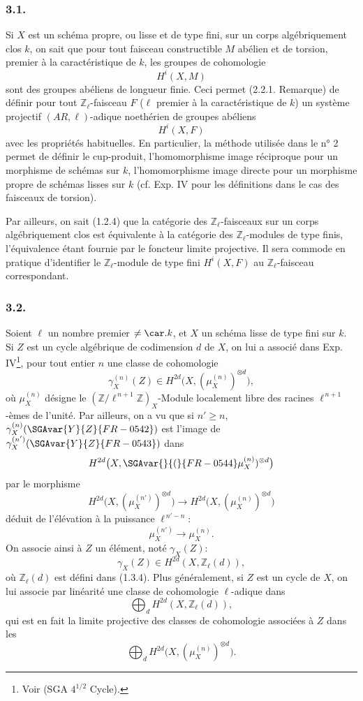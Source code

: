 \subsubsection*{3.1.}
Si \(X\) est un schéma propre, ou lisse et de type fini, sur un corps algébriquement clos \(k\), on sait que pour tout faisceau constructible \(M\) abélien et de torsion, premier à la caractéristique de \(k\), les groupes de cohomologie
\[
H^i(X,M)
\]
sont des groupes abéliens de longueur finie. Ceci permet (2.2.1. Remarque) de définir pour tout \(\mathbb{Z}_\ell\)-faisceau \(F\) (\(\ell\) premier à la caractéristique de \(k\)) un système projectif \((AR,\ell)\)-adique noethérien de groupes abéliens
\[
H^i(X,F)
\]
avec les propriétés habituelles. En particulier, la méthode utilisée dans le n° 2 permet de définir le cup-produit, l'homomorphisme image réciproque pour un morphisme de schémas sur \(k\), l'homomorphisme image directe pour un morphisme propre de schémas lisses sur \(k\) (cf. Exp. IV pour les définitions dans le cas des faisceaux de torsion).

Par ailleurs, on sait (1.2.4) que la catégorie des \(\mathbb{Z}_\ell\)-faisceaux sur un corps algébriquement clos est équivalente à la catégorie des \(\mathbb{Z}_\ell\)-modules de type finis, l'équivalence étant fournie par le foncteur limite projective. Il sera commode en pratique d'identifier le \(\mathbb{Z}_\ell\)-module de type fini \(H^i(X,F)\) au \(\mathbb{Z}_\ell\)-faisceau correspondant.

\subsubsection*{3.2.}
Soient \(\ell\) un nombre premier \(\ne\car.k\), et \(X\) un schéma lisse de type fini sur \(k\). Si \(Z\) est un cycle algébrique de codimension \(d\) de \(X\), on lui a associé dans Exp. IV\footnote{Voir (SGA \(4^{1/2}\) Cycle).}, pour tout entier \(n\) une classe de cohomologie
\[
\gamma_X^{(n)}(Z)\in H^{2d}\bigl(X,(\mu_X^{(n)})^{\otimes d}\bigr),
\]
où \(\mu_X^{(n)}\) désigne le \((\mathbb{Z}/\ell^{\,n+1}\mathbb{Z})_X\)-Module localement libre des racines \(\ell^{\,n+1}\)-èmes de l'unité. Par ailleurs, on a vu que si \(n'\ge n\), \(\gamma_X^{(n)}(\SGAvar{Y}{Z}{FR-0542})\) est l'image de \(\gamma_X^{(n')}(\SGAvar{Y}{Z}{FR-0543})\) dans
\[
H^{2d}\bigl(X,\SGAvar{}{(}{FR-0544}\mu_X^{(n)})^{\otimes d}\bigr)
\]
par le morphisme
\[
H^{2d}\bigl(X,(\mu_X^{(n')})^{\otimes d}\bigr)
\longrightarrow
H^{2d}\bigl(X,(\mu_X^{(n)})^{\otimes d}\bigr)
\]
déduit de l'élévation à la puissance \(\ell^{\,n'-n}\):
\[
\mu_X^{(n')}\longrightarrow \mu_X^{(n)}.
\]
On associe ainsi à \(Z\) un élément, noté \(\gamma_X(Z)\):
\[
\gamma_X(Z)\in H^{2d}(X,\mathbb{Z}_\ell(d)),
\]
où \(\mathbb{Z}_\ell(d)\) est défini dans (1.3.4). Plus généralement, si \(Z\) est un cycle de \(X\), on lui associe par linéarité une classe de cohomologie \(\ell\)-adique dans
\[
\bigoplus_d H^{2d}(X,\mathbb{Z}_\ell(d)),
\]
qui est en fait la limite projective des classes de cohomologie associées à \(Z\) dans les
\[
\bigoplus_d H^{2d}\bigl(X,(\mu_X^{(n)})^{\otimes d}\bigr).
\]

